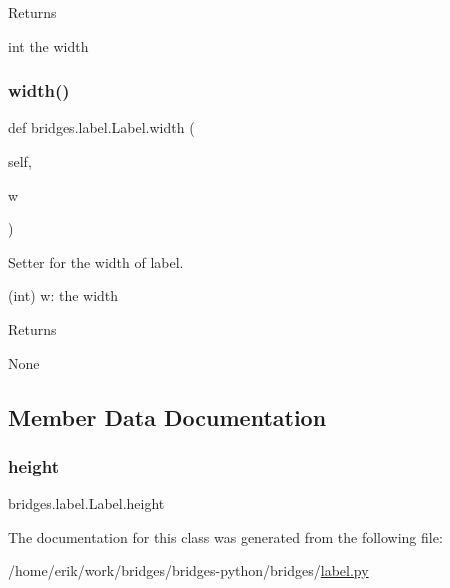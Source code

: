 \begin{DoxyReturn}{Returns}


int the width 
\end{DoxyReturn}
\mbox{\label{classbridges_1_1label_1_1_label_a724fe127712eb8672f1c377c2c2df500}} 
\subsubsection{\texorpdfstring{width()}{width()}\hspace{0.1cm}{\footnotesize\ttfamily [2/2]}}
{\footnotesize\ttfamily def bridges.\+label.\+Label.\+width (\begin{DoxyParamCaption}\item[{}]{self,  }\item[{}]{w }\end{DoxyParamCaption})}



Setter for the width of label. 

(int) w\+: the width \begin{DoxyReturn}{Returns}


None 
\end{DoxyReturn}


\subsection{Member Data Documentation}
\mbox{\label{classbridges_1_1label_1_1_label_a2bf622aa77b4ad7d6918db99a8bfd4da}} 
\subsubsection{\texorpdfstring{height}{height}}
{\footnotesize\ttfamily bridges.\+label.\+Label.\+height}



The documentation for this class was generated from the following file\+:\begin{DoxyCompactItemize}
\item 
/home/erik/work/bridges/bridges-\/python/bridges/\hyperlink{label_8py}{label.\+py}\end{DoxyCompactItemize}
